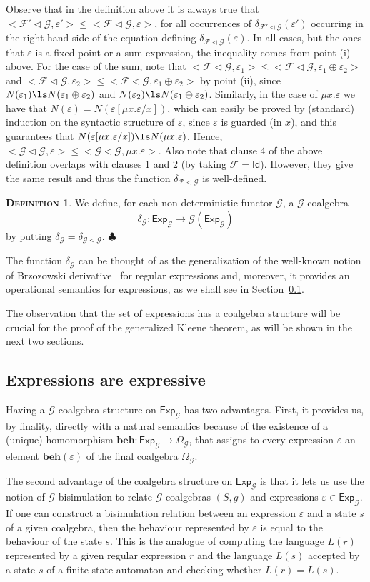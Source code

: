 \documentclass{LMCS}
\newcommand\E\varepsilon
\newcommand\Exp{\mathsf{Exp}}
\newcommand\id{\mathsf{Id}}
\newcommand\G{\mathcal{G}}
\newcommand\F{\mathcal{F}}
\def\hyph{-\penalty0\hskip0pt\relax}
\theoremstyle{definition}
\newtheorem{mydefinition}{\textsc{Definition}}[section]
\theoremstyle{plain}
\theoremstyle{plain}
\theoremstyle{plain}
\theoremstyle{plain}
\theoremstyle{definition}
\theoremstyle{definition}
\newenvironment{definition}{
\begin{mydefinition}}
    {\hfill$\clubsuit$\end{mydefinition}}
\begin{document}
Observe that in the definition above it is always true that
$<\F'\lhd \G, \E'> \leq <\F\lhd \G, \E>$, for all occurrences of
$\delta_{\F'\lhd \G}(\E')$ occurring in the right hand side of the
equation defining $\delta_{\F\lhd \G}(\E)$. In all cases, but the ones
that $\E$ is a fixed point or a sum expression, the inequality comes
from point (i) above. For the case of the sum, note that $<\F\lhd
\G,\E_1> \leq <\F\lhd \G,  \E_1\oplus\E_2>$ and  $<\F\lhd \G, \E_2> \leq
<\F\lhd \G,  \E_1\oplus\E_2>$ by point (ii), since $N(\E_1) \ls  N(\E_1\oplus\E_2)$ and $N(\E_2) \ls N(\E_1\oplus\E_2)$. Similarly, in the case of $\mu x.\E$ we
have that $N(\E) = N(\E[\mu x.\E/x])$, which can easily be proved by (standard) induction on the
syntactic structure of $\E$, since $\E$ is guarded (in $x$), and this
guarantees that $N(\E[\mu x.\E/x]) \ls N(\mu x. \E)$. Hence, $<\G\lhd
\G,\E> \leq <\G\lhd \G,\mu x.\E>$. Also note that clause
4 of the above definition overlaps with clauses 1 and 2 (by taking
$\F=\id$). However, they give the same result and
thus the function $\delta_{\F\lhd \G}$ is well-defined.

\begin{definition}
We define, for each non\hyph deterministic functor $\G$, a $\G$-coalgebra
\[
\delta_\G\colon \Exp_\G \to \G(\Exp_\G)
\]
by putting $\delta_\G = \delta_{\G\lhd \G}$.
\end{definition}
The function $\delta_\G$ can be thought of as the generalization of
the well-known notion of Brzozowski derivative~\cite{Brz64} for regular
expressions and, moreover, it provides an operational semantics for
expressions, as we shall see in Section~\ref{sec:expressive}.

The observation that the set of expressions has a coalgebra structure
will be crucial for the proof of the generalized Kleene theorem,
as will be shown in the next two sections.

\subsection{Expressions are expressive}\label{sec:expressive}

Having a $\G$-coalgebra structure on $\Exp_\G$ has two advantages. First,
it provides us, by finality, directly with a natural semantics
because of the existence of a (unique) homomorphism $\mathbf{beh} \colon \Exp_\G
\to \Omega_\G $, that
 assigns to every expression $\E$ an element $\mathbf{beh}(\E)$ of the
final coalgebra $\Omega_\G$.

The second advantage of the coalgebra structure on $\Exp_\G$ is that
it lets us use the notion of $\G$-bisimulation to relate
$\G$-coalgebras $(S,g)$ and expressions $\E\in \Exp_\G$. If one can
construct a bisimulation relation between an expression $\E$ and a
state $s$ of a given coalgebra, then the behaviour represented by
$\E$ is equal to the behaviour of the state $s$. This is the
analogue of computing the language $L(r)$ represented by a given
regular expression $r$ and the language $L(s)$ accepted by a state
$s$ of a finite state automaton and checking whether $L(r) = L(s)$.
\end{document}
